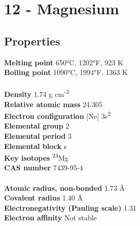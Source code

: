 \section{12 - Magnesium}
\label{sec:elem-magnesium}
\subsection{Properties}
\textbf{Melting point} 650°C, 1202°F, 923 K\\
\textbf{Boiling point} 1090°C, 1994°F, 1363 K\\
\\
\textbf{Density} 1.74 g cm\textsuperscript{-3}\\
\textbf{Relative atomic mass} 24.305\\
\textbf{Electron configuration} [Ne] 3s\textsuperscript{2}\\
\textbf{Elemental group} 2\\
\textbf{Elemental period} 3\\
\textbf{Elemental block} s\\
\textbf{Key isotopes} \textsuperscript{24}Mg\\
\textbf{CAS number} 7439-95-4\\
\\
\textbf{Atomic radius, non-bonded} 1.73 Å\\
\textbf{Covalent radius} 1.40 Å\\
\textbf{Electronegativity (Pauling scale)} 1.31\\
\textbf{Electron affinity} Not stable\\